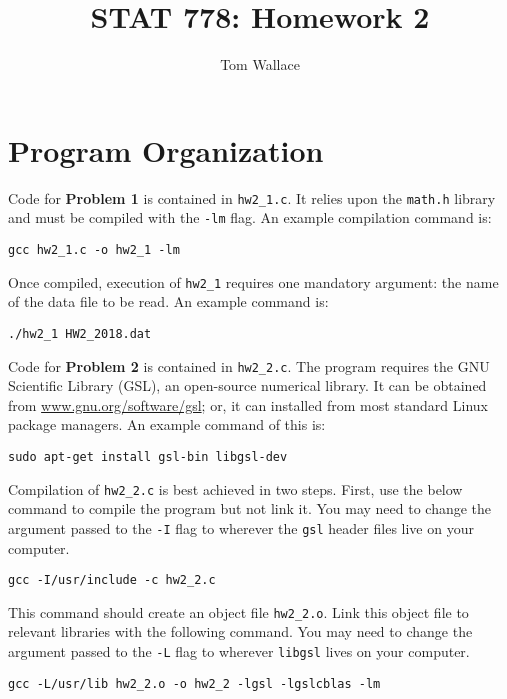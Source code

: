 \documentclass{article}
\author{Tom Wallace}
\title{STAT 778: Homework 2}
\begin{document}
\maketitle

\section{Program Organization}

Code for \textbf{Problem 1} is contained in \texttt{hw2\_1.c}. It relies upon the 
\texttt{math.h} library and must be compiled with the \texttt{-lm} flag. An
example compilation command is:

\begin{center}
	\texttt{gcc hw2\_1.c -o hw2\_1 -lm}
\end{center}

Once compiled, execution of \texttt{hw2\_1} requires one mandatory argument: the name of the
data file to be read. An example command is:

\begin{center}
	\texttt{./hw2\_1 HW2\_2018.dat}
\end{center}

Code for \textbf{Problem 2} is contained in \texttt{hw2\_2.c}. The program
requires the GNU Scientific Library (GSL), an
open-source numerical library. It can be obtained from
\url{www.gnu.org/software/gsl}; or, it can installed from most standard Linux
package managers. An example command of this is:

\begin{center}
	\texttt{sudo apt-get install gsl-bin libgsl-dev}
\end{center}

Compilation of \texttt{hw2\_2.c} is best achieved in two steps. First, use the below
command to compile the program but not link it. You may need to change the
argument passed to the \texttt{-I} flag to wherever the \texttt{gsl} header
files live on your computer. 

\begin{center}
	\texttt{gcc -I/usr/include -c hw2\_2.c}
\end{center}

This command should create an object file \texttt{hw2\_2.o}. Link this 
object file to relevant libraries with the following command.
You may need to change the argument passed to the \texttt{-L} flag to
wherever \texttt{libgsl} lives on your computer.

\begin{center}
	\texttt{gcc -L/usr/lib hw2\_2.o -o hw2\_2 -lgsl -lgslcblas -lm}
\end{center}
\end{document}

